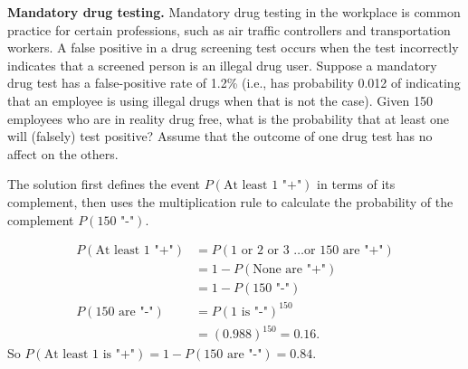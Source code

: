 \begin{doublespace}

\begin{example}{\textbf{Mandatory drug testing.} Mandatory drug testing in the workplace is common practice for certain professions, such as air traffic controllers and transportation workers.  A false positive in a drug screening test occurs when the test incorrectly indicates that a screened person is an illegal drug user. Suppose a mandatory drug test has a false-positive rate of 1.2\% (i.e., has probability  0.012 of indicating that an employee is using illegal drugs when that is not the case).  Given 150 employees who are in reality drug free, what is the probability that at least one will (falsely) test positive? Assume that the outcome of one drug test has no affect on the others.}

The solution first defines the event $P(\text{At least 1 "+"})$ in terms of its complement, then uses the multiplication rule to calculate the probability of the complement $P(\text{150 "-"})$.

   \begin{align*} 
   P(\text{At least 1 "+"}) &= P(\text{1 or 2 or 3 \ldots or 150 are "+"}) \\
           &= 1 - P(\text{None are "+"}) \\
           &= 1 - P(\text{150 "-"}) \\
 P(\text{150 are "-"}) &= P(\text{1 is "-"})^{150} \\
           &= (0.988)^{150} = 0.16.
    \end{align*}
   So $P(\text{At least 1 is "+"})  = 1 - P(\text{150 are "-"}) = 0.84.$
 

\end{example}
\end{doublespace}
